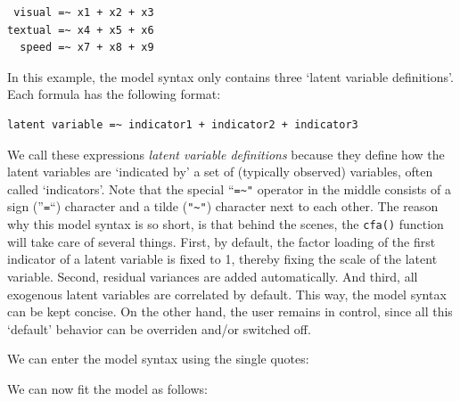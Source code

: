 \begin{verbatim}
 visual =~ x1 + x2 + x3
textual =~ x4 + x5 + x6
  speed =~ x7 + x8 + x9
\end{verbatim}

In this example, the model syntax only contains three `latent variable
definitions'. Each formula has the following format:

\begin{verbatim}
latent variable =~ indicator1 + indicator2 + indicator3
\end{verbatim}

We call these expressions \emph{latent variable definitions} because
they define how the latent variables are `indicated by' a set of
(typically observed) variables, often called `indicators'. Note that the
special ``\texttt{=\textasciitilde{}"} operator in the middle consists
of a sign (''\texttt{=}``) character and a tilde
(\texttt{"\textasciitilde{}"}) character next to each other. The reason
why this model syntax is so short, is that behind the scenes, the
\texttt{cfa()} function will take care of several things. First, by
default, the factor loading of the first indicator of a latent variable
is fixed to 1, thereby fixing the scale of the latent variable. Second,
residual variances are added automatically. And third, all exogenous
latent variables are correlated by default. This way, the model syntax
can be kept concise. On the other hand, the user remains in control,
since all this `default' behavior can be overriden and/or switched off.

We can enter the model syntax using the single quotes:

\begin{Shaded}
\begin{Highlighting}[]
\OtherTok{\textless{}{-}} 
\end{Highlighting}
\end{Shaded}

We can now fit the model as follows:

\begin{Shaded}
\begin{Highlighting}[]
\OtherTok{\textless{}{-}} 
\end{Highlighting}
\end{Shaded}

